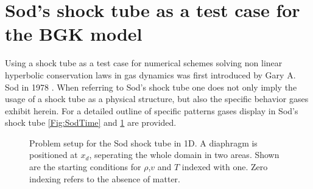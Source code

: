 \section{Sod's shock tube as a test case for the BGK model} \label{Sec:FeaturesSOD}
Using a shock tube as a test case for numerical schemes solving non linear hyperbolic conservation laws in gas dynamics was first introduced by Gary A. Sod in 1978 \cite{Sod}. When referring to Sod's shock tube one does not only imply the usage of a shock tube as a physical structure, but also the specific behavior gases exhibit herein. For a detailed outline of specific patterns gases display in Sod's shock tube \cref{Fig:SodTime} and \cref{Fig:SodProbSetup} are provided.
\begin{figure}[H]
	\centering
	
	\caption{Problem setup for the Sod shock tube in 1D. A diaphragm is positioned at \(x_d\), seperating the whole domain in two areas. Shown are the starting conditions for \(\rho\),\(v\) and \(T\) indexed with one. Zero indexing refers to the absence of matter.}
	\label{Fig:SodProbSetup}
\end{figure}
